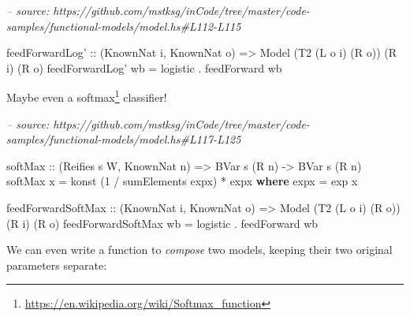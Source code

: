 \documentclass[]{article}
\newenvironment{Shaded}{}{}
\newcommand{\CommentTok}[1]{\textcolor[rgb]{0.38,0.63,0.69}{\textit{#1}}}
\newcommand{\DataTypeTok}[1]{\textcolor[rgb]{0.56,0.13,0.00}{#1}}
\newcommand{\DecValTok}[1]{\textcolor[rgb]{0.25,0.63,0.44}{#1}}
\newcommand{\FunctionTok}[1]{\textcolor[rgb]{0.02,0.16,0.49}{#1}}
\newcommand{\KeywordTok}[1]{\textcolor[rgb]{0.00,0.44,0.13}{\textbf{#1}}}
\newcommand{\NormalTok}[1]{#1}
\newcommand{\OtherTok}[1]{\textcolor[rgb]{0.00,0.44,0.13}{#1}}
\renewcommand{\href}[2]{#2\footnote{\url{#1}}}
\begin{document}
\begin{Shaded}
\begin{Highlighting}[]
\CommentTok{-- source: https://github.com/mstksg/inCode/tree/master/code-samples/functional-models/model.hs#L112-L115}

\NormalTok{feedForwardLog'}
\OtherTok{    ::}\NormalTok{ (}\DataTypeTok{KnownNat}\NormalTok{ i, }\DataTypeTok{KnownNat}\NormalTok{ o)}
    \OtherTok{=>} \DataTypeTok{Model}\NormalTok{ (}\DataTypeTok{T2}\NormalTok{ (}\DataTypeTok{L}\NormalTok{ o i) (}\DataTypeTok{R}\NormalTok{ o)) (}\DataTypeTok{R}\NormalTok{ i) (}\DataTypeTok{R}\NormalTok{ o)}
\NormalTok{feedForwardLog' wb }\FunctionTok{=}\NormalTok{ logistic }\FunctionTok{.}\NormalTok{ feedForward wb}
\end{Highlighting}
\end{Shaded}

Maybe even a \href{https://en.wikipedia.org/wiki/Softmax_function}{softmax}
classifier!

\begin{Shaded}
\begin{Highlighting}[]
\CommentTok{-- source: https://github.com/mstksg/inCode/tree/master/code-samples/functional-models/model.hs#L117-L125}

\OtherTok{softMax ::}\NormalTok{ (}\DataTypeTok{Reifies}\NormalTok{ s }\DataTypeTok{W}\NormalTok{, }\DataTypeTok{KnownNat}\NormalTok{ n) }\OtherTok{=>} \DataTypeTok{BVar}\NormalTok{ s (}\DataTypeTok{R}\NormalTok{ n) }\OtherTok{->} \DataTypeTok{BVar}\NormalTok{ s (}\DataTypeTok{R}\NormalTok{ n)}
\NormalTok{softMax x }\FunctionTok{=}\NormalTok{ konst (}\DecValTok{1} \FunctionTok{/}\NormalTok{ sumElements expx) }\FunctionTok{*}\NormalTok{ expx}
  \KeywordTok{where}
\NormalTok{    expx }\FunctionTok{=}\NormalTok{ exp x}

\NormalTok{feedForwardSoftMax}
\OtherTok{    ::}\NormalTok{ (}\DataTypeTok{KnownNat}\NormalTok{ i, }\DataTypeTok{KnownNat}\NormalTok{ o)}
    \OtherTok{=>} \DataTypeTok{Model}\NormalTok{ (}\DataTypeTok{T2}\NormalTok{ (}\DataTypeTok{L}\NormalTok{ o i) (}\DataTypeTok{R}\NormalTok{ o)) (}\DataTypeTok{R}\NormalTok{ i) (}\DataTypeTok{R}\NormalTok{ o)}
\NormalTok{feedForwardSoftMax wb }\FunctionTok{=}\NormalTok{ logistic }\FunctionTok{.}\NormalTok{ feedForward wb}
\end{Highlighting}
\end{Shaded}

We can even write a function to \emph{compose} two models, keeping their two
original parameters separate:
\end{document}
